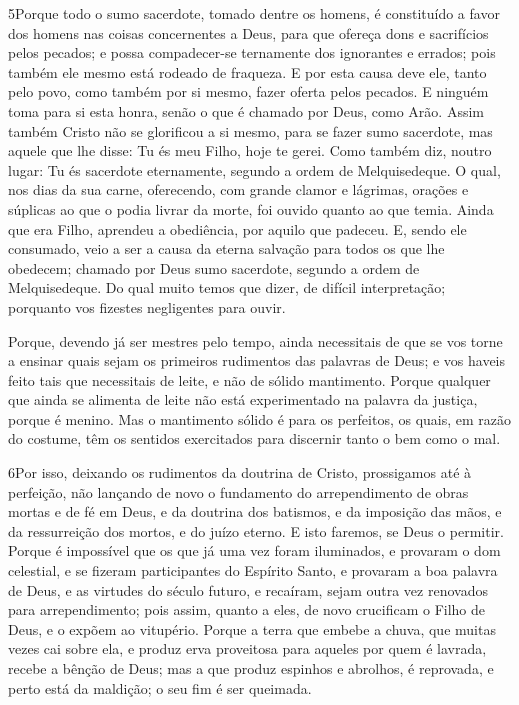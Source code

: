 \lettrine{5} Porque todo o sumo sacerdote, tomado dentre os
homens, é constituído a favor dos homens nas coisas concernentes a
Deus, para que ofereça dons e sacrifícios pelos pecados; e possa
compadecer-se ternamente dos ignorantes e errados; pois também ele
mesmo está rodeado de fraqueza. E por esta causa deve ele, tanto
pelo povo, como também por si mesmo, fazer oferta pelos pecados.
E ninguém toma para si esta honra, senão o que é chamado por
Deus, como Arão. Assim também Cristo não se glorificou a si
mesmo, para se fazer sumo sacerdote, mas aquele que lhe disse: Tu és
meu Filho, hoje te gerei. Como também diz, noutro lugar: Tu és
sacerdote eternamente, segundo a ordem de Melquisedeque. O qual,
nos dias da sua carne, oferecendo, com grande clamor e lágrimas,
orações e súplicas ao que o podia livrar da morte, foi ouvido quanto
ao que temia. Ainda que era Filho, aprendeu a obediência, por
aquilo que padeceu. E, sendo ele consumado, veio a ser a causa
da eterna salvação para todos os que lhe obedecem; chamado
por Deus sumo sacerdote, segundo a ordem de Melquisedeque. Do
qual muito temos que dizer, de difícil interpretação; porquanto vos
fizestes negligentes para ouvir.

Porque, devendo já ser mestres pelo tempo, ainda necessitais de
que se vos torne a ensinar quais sejam os primeiros rudimentos das
palavras de Deus; e vos haveis feito tais que necessitais de leite,
e não de sólido mantimento. Porque qualquer que ainda se
alimenta de leite não está experimentado na palavra da justiça,
porque é menino. Mas o mantimento sólido é para os perfeitos,
os quais, em razão do costume, têm os sentidos exercitados para
discernir tanto o bem como o mal.

\medskip

\lettrine{6} Por isso, deixando os rudimentos da doutrina de
Cristo, prossigamos até à perfeição, não lançando de novo o
fundamento do arrependimento de obras mortas e de fé em Deus, e
da doutrina dos batismos, e da imposição das mãos, e da ressurreição
dos mortos, e do juízo eterno. E isto faremos, se Deus o
permitir. Porque é impossível que os que já uma vez foram
iluminados, e provaram o dom celestial, e se fizeram participantes
do Espírito Santo, e provaram a boa palavra de Deus, e as
virtudes do século futuro, e recaíram, sejam outra vez renovados
para arrependimento; pois assim, quanto a eles, de novo crucificam o
Filho de Deus, e o expõem ao vitupério. Porque a terra que
embebe a chuva, que muitas vezes cai sobre ela, e produz erva
proveitosa para aqueles por quem é lavrada, recebe a bênção de Deus;
mas a que produz espinhos e abrolhos, é reprovada, e perto está
da maldição; o seu fim é ser queimada.

